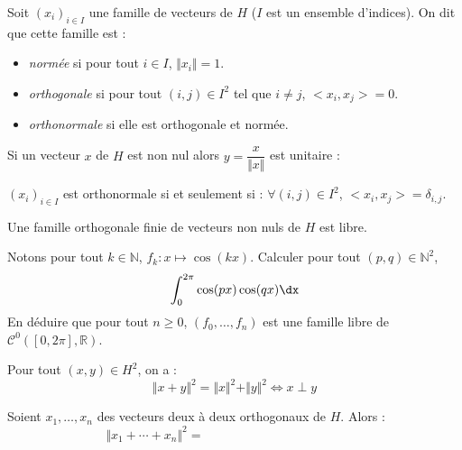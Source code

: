 \documentclass[a4paper,10pt]{report}
\begin{document}
\begin{defin} Soit $(x_i)_{i \in I}$ une famille de vecteurs de $H$ ($I$ est un ensemble d'indices). On dit que cette famille est :
\begin{itemize}
\item \textit{normée} si pour tout $i \in I$, $\Vert x_i \Vert=1$.
\item \textit{orthogonale} si pour tout $(i,j) \in I^2$ tel que $i \neq j$, $<x_i ,x_j>=0$.
\item \textit{orthonormale} si elle est orthogonale et normée.
\end{itemize}
\end{defin}

\begin{rems}
\item Si un vecteur $x$ de $H$ est non nul alors $y = \dfrac{x}{\Vert x \Vert}$ est unitaire :

\vspace{2cm}
\item $(x_i)_{i \in I}$ est orthonormale si et seulement si : $\forall (i,j) \in I^2$, $<x_i,x_j>= \delta_{i,j}$.
\end{rems}

\begin{prop} Une famille orthogonale finie de vecteurs non nuls de $H$ est libre.
\end{prop}

\begin{preuve}
\vspace{5cm}
\end{preuve}

\begin{exa} Notons pour tout $k \in \mathbb{N}$, $f_k : x \mapsto \cos(kx)$. Calculer pour tout $(p,q) \in \mathbb{N}^2$,
$$ \int_{0}^{2 \pi} \cos(px) \cos(qx) \dx$$
En déduire que pour tout $n \geq 0$, $(f_0, \ldots, f_n)$ est une famille libre de $\mathcal{C}^0([0,2 \pi],\mathbb{R})$.
\end{exa}

\begin{thm}[Pythagore]
Pour tout $(x,y) \in H^2$, on a :
$$ \Vert x+y \Vert^2 = \Vert x \Vert^2 + \Vert y \Vert^2 \Longleftrightarrow x \perp y $$
\end{thm}

\begin{preuve}
\vspace{4cm}
\end{preuve}

\begin{rem} Soient $x_1, \ldots, x_n$ des vecteurs deux à deux orthogonaux de $H$. Alors :
$$ \Vert x_1 + \cdots + x_n \Vert^2 = \phantom{blablablablablablablablablabla}$$

\vspace{3cm}
\end{rem}
\end{document}
